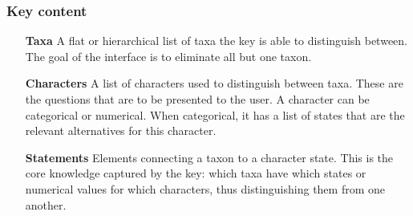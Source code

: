 \documentclass[10pt,letterpaper]{article}
\begin{document}
\subsubsection*{
Key content
}
\begin{itemize}
\item[\textbf{Taxa}]
A flat or hierarchical list of taxa the key is able to distinguish between. The goal of the interface is to eliminate all but one taxon.
\item[\textbf{Characters}]
A list of characters used to distinguish between taxa. These are the questions that are to be presented to the user. A character can be categorical or numerical. When categorical, it has a list of states that are the relevant alternatives for this character.
\item[\textbf{Statements}]
Elements connecting a taxon to a character state. This is the core knowledge captured by the key: which taxa have which states or numerical values for which characters, thus distinguishing them from one another.
\end{itemize}
\end{document}
